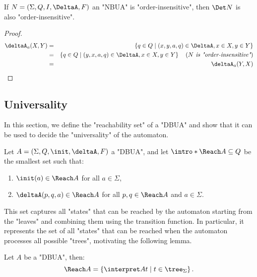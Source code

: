 \documentclass[a4paper,UKenglish,cleveref, autoref, thm-restate]{lipics-v2021}
\begin{document}
\begin{lemma}
	If $N = \NBUA$ an "NBUA" is "order-insensitive", then $\Det N$ is also "order-insensitive".
\end{lemma}

\begin{proof}
	\begin{eqnarray*}
		\deltaA_a (X,Y) &=& \setdef {q \in Q} {(x,y,a,q) \in \DeltaA, x \in X, y \in Y} \\
		&=& \setdef {q \in Q} {(y,x,a,q) \in \DeltaA, x \in X, y \in Y}  \reason {$N$ is "order-insensitive"} \\
		&=& \deltaA_a (Y,X)
	\end{eqnarray*}
\end{proof}

\subsection{Universality}\label{sec:UniversalityAutomata}

In this section, we define the "reachability set" of a "DBUA" and show that it can be used to decide the "universality" of the automaton.

\begin{definition}
	\AP Let $A = \DBUA$ a "DBUA", and let $\intro* \Reach A \subseteq Q$ be the smallest set such that:
	\begin{enumerate}
		\item $\init(a) \in \Reach A$ for all $a \in \Sigma$,
		\item $\deltaA(p, q, a) \in \Reach A$ for all $p, q \in \Reach A$ and $a \in \Sigma$.
	\end{enumerate}
\end{definition}

This set captures all "states" that can be reached by the automaton starting from the "leaves" and combining them using the transition function.
In particular, it represents the set of all "states" that can be reached when the automaton processes all possible "trees", motivating the following lemma.

\begin{lemma}
	Let $A$ be a "DBUA", then:
	\[
		\Reach A = \setdef {\interpret A t} {t \in \tree_\Sigma}.
	\]
\end{lemma}
\end{document}
